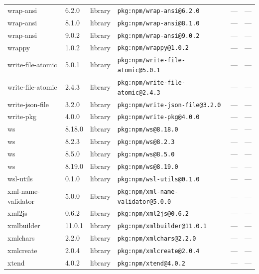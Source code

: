 \documentclass[11pt,a4paper]{article}
\begin{document}
\begin{longtable}{|p{4cm}|p{2cm}|p{1.6cm}|p{5cm}|p{1.5cm}|p{3.5cm}|}
\raggedright wrap-ansi & 6.2.0 & library & \small\texttt{pkg:npm/wrap-ansi@6.2.0} & — & \small — \\
\raggedright wrap-ansi & 8.1.0 & library & \small\texttt{pkg:npm/wrap-ansi@8.1.0} & — & \small — \\
\raggedright wrap-ansi & 9.0.2 & library & \small\texttt{pkg:npm/wrap-ansi@9.0.2} & — & \small — \\
\raggedright wrappy & 1.0.2 & library & \small\texttt{pkg:npm/wrappy@1.0.2} & — & \small — \\
\raggedright write-file-atomic & 5.0.1 & library & \small\texttt{pkg:npm/write-file-atomic@5.0.1} & — & \small — \\
\raggedright write-file-atomic & 2.4.3 & library & \small\texttt{pkg:npm/write-file-atomic@2.4.3} & — & \small — \\
\raggedright write-json-file & 3.2.0 & library & \small\texttt{pkg:npm/write-json-file@3.2.0} & — & \small — \\
\raggedright write-pkg & 4.0.0 & library & \small\texttt{pkg:npm/write-pkg@4.0.0} & — & \small — \\
\raggedright ws & 8.18.0 & library & \small\texttt{pkg:npm/ws@8.18.0} & — & \small — \\
\raggedright ws & 8.2.3 & library & \small\texttt{pkg:npm/ws@8.2.3} & — & \small — \\
\raggedright ws & 8.5.0 & library & \small\texttt{pkg:npm/ws@8.5.0} & — & \small — \\
\raggedright ws & 8.19.0 & library & \small\texttt{pkg:npm/ws@8.19.0} & — & \small — \\
\raggedright wsl-utils & 0.1.0 & library & \small\texttt{pkg:npm/wsl-utils@0.1.0} & — & \small — \\
\raggedright xml-name-validator & 5.0.0 & library & \small\texttt{pkg:npm/xml-name-validator@5.0.0} & — & \small — \\
\raggedright xml2js & 0.6.2 & library & \small\texttt{pkg:npm/xml2js@0.6.2} & — & \small — \\
\raggedright xmlbuilder & 11.0.1 & library & \small\texttt{pkg:npm/xmlbuilder@11.0.1} & — & \small — \\
\raggedright xmlchars & 2.2.0 & library & \small\texttt{pkg:npm/xmlchars@2.2.0} & — & \small — \\
\raggedright xmlcreate & 2.0.4 & library & \small\texttt{pkg:npm/xmlcreate@2.0.4} & — & \small — \\
\raggedright xtend & 4.0.2 & library & \small\texttt{pkg:npm/xtend@4.0.2} & — & \small — \\

\end{longtable}
\end{document}
